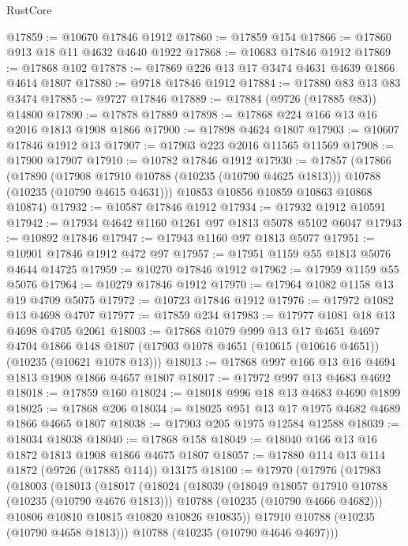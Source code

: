 \begin{lexlean}{RustCore}
\begin{coremodule}
@17859 := @10670 @17846 @1912
@17860 := @17859 @154
@17866 := @17860 @913 @18 @11 @4632 @4640 @1922
@17868 := @10683 @17846 @1912
@17869 := @17868 @102
@17878 := @17869 @226 @13 @17 @3474 @4631 @4639 @1866 @4614 @1807
@17880 := @9718 @17846 @1912
@17884 := @17880 @83 @13 @83 @3474
@17885 := @9727 @17846
@17889 := @17884 (@9726 (@17885 @83)) @14800
@17890 := @17878 @17889
@17898 := @17868 @224 @166 @13 @16 @2016 @1813 @1908 @1866
@17900 := @17898 @4624 @1807
@17903 := @10607 @17846 @1912 @13
@17907 := @17903 @223 @2016 @11565 @11569
@17908 := @17900 @17907
@17910 := @10782 @17846 @1912
@17930 := @17857
    (@17866
      (@17890
        (@17908 @17910 @10788 (@10235 (@10790 @4625 @1813)))
        @10788
        (@10235 (@10790 @4615 @4631)))
      @10853
      @10856
      @10859
      @10863
      @10868
      @10874)
@17932 := @10587 @17846 @1912
@17934 := @17932 @1912 @10591
@17942 := @17934 @4642 @1160 @1261 @97 @1813 @5078 @5102 @6047
@17943 := @10892 @17846
@17947 := @17943 @1160 @97 @1813 @5077
@17951 := @10901 @17846 @1912 @472 @97
@17957 := @17951 @1159 @55 @1813 @5076 @4644 @14725
@17959 := @10270 @17846 @1912
@17962 := @17959 @1159 @55 @5076
@17964 := @10279 @17846 @1912
@17970 := @17964 @1082 @1158 @13 @19 @4709 @5075
@17972 := @10723 @17846 @1912
@17976 := @17972 @1082 @13 @4698 @4707
@17977 := @17859 @234
@17983 := @17977 @1081 @18 @13 @4698 @4705 @2061
@18003 := @17868
    @1079
    @999
    @13
    @17
    @4651
    @4697
    @4704
    @1866
    @148
    @1807
    (@17903 @1078 @4651 (@10615 (@10616 @4651)) (@10235 (@10621 @1078 @13)))
@18013 := @17868 @997 @166 @13 @16 @4694 @1813 @1908 @1866 @4657 @1807
@18017 := @17972 @997 @13 @4683 @4692
@18018 := @17859 @160
@18024 := @18018 @996 @18 @13 @4683 @4690 @1899
@18025 := @17868 @206
@18034 := @18025 @951 @13 @17 @1975 @4682 @4689 @1866 @4665 @1807
@18038 := @17903 @205 @1975 @12584 @12588
@18039 := @18034 @18038
@18040 := @17868 @158
@18049 := @18040 @166 @13 @16 @1872 @1813 @1908 @1866 @4675 @1807
@18057 := @17880 @114 @13 @114 @1872 (@9726 (@17885 @114)) @13175
@18100 := @17970
    (@17976
      (@17983
        (@18003
          (@18013
            (@18017
              (@18024
                (@18039
                  (@18049 @18057 @17910 @10788 (@10235 (@10790 @4676 @1813)))
                  @10788
                  (@10235 (@10790 @4666 @4682)))
                @10806
                @10810
                @10815
                @10820
                @10826
                @10835))
            @17910
            @10788
            (@10235 (@10790 @4658 @1813)))
          @10788
          (@10235 (@10790 @4646 @4697)))

\end{coremodule}
\end{lexlean}
